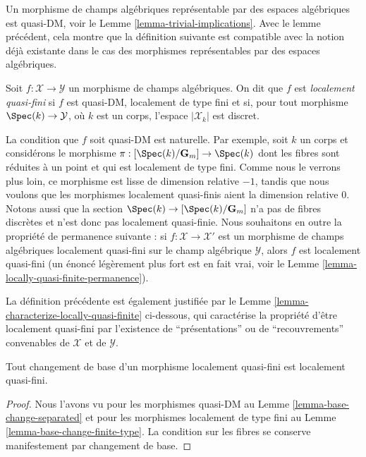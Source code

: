 \noindent
Un morphisme de champs algébriques représentable par des espaces algébriques
est quasi-DM, voir le Lemme \ref{lemma-trivial-implications}.
Avec le lemme précédent, cela montre que la définition suivante est compatible
avec la notion déjà existante dans le cas des morphismes représentables par
des espaces algébriques.

\begin{definition}
\label{definition-locally-quasi-finite}
Soit $f : \mathcal{X} \to \mathcal{Y}$ un morphisme de champs algébriques.
On dit que $f$ est {\it localement quasi-fini} si $f$ est quasi-DM, localement
de type fini et si, pour tout morphisme $\Spec(k) \to \mathcal{Y}$, où
$k$ est un corps, l'espace $|\mathcal{X}_k|$ est discret.
\end{definition}

\noindent
La condition que $f$ soit quasi-DM est naturelle. Par exemple, soit $k$ un
corps et considérons le morphisme
$\pi : [\Spec(k)/\mathbf{G}_m] \to \Spec(k)$
dont les fibres sont réduites à un point et qui est localement de type fini.
Comme nous le verrons plus loin, ce morphisme est lisse de dimension relative
$-1$, tandis que nous voulons que les morphismes localement quasi-finis aient
la dimension relative $0$. Notons aussi que la section
$\Spec(k) \to [\Spec(k)/\mathbf{G}_m]$ n'a pas de fibres discrètes et n'est
donc pas localement quasi-finie. Nous souhaitons en outre la propriété de
permanence suivante : si $f : \mathcal{X} \to \mathcal{X}'$ est un morphisme
de champs algébriques localement quasi-fini sur le champ algébrique
$\mathcal{Y}$, alors $f$ est localement quasi-fini (un énoncé légèrement plus
fort est en fait vrai, voir le
Lemme \ref{lemma-locally-quasi-finite-permanence}).

\medskip\noindent
La définition précédente est également justifiée par le
Lemme \ref{lemma-characterize-locally-quasi-finite} ci-dessous, qui caractérise
la propriété d'être localement quasi-fini par l'existence de
``présentations'' ou de ``recouvrements'' convenables de
$\mathcal{X}$ et de $\mathcal{Y}$.

\begin{lemma}
\label{lemma-base-change-locally-quasi-finite}
Tout changement de base d'un morphisme localement quasi-fini est localement
quasi-fini.
\end{lemma}

\begin{proof}
Nous l'avons vu pour les morphismes quasi-DM au
Lemme \ref{lemma-base-change-separated} et pour les morphismes localement de
type fini au Lemme \ref{lemma-base-change-finite-type}.
La condition sur les fibres se conserve manifestement par changement de base.
\end{proof}

